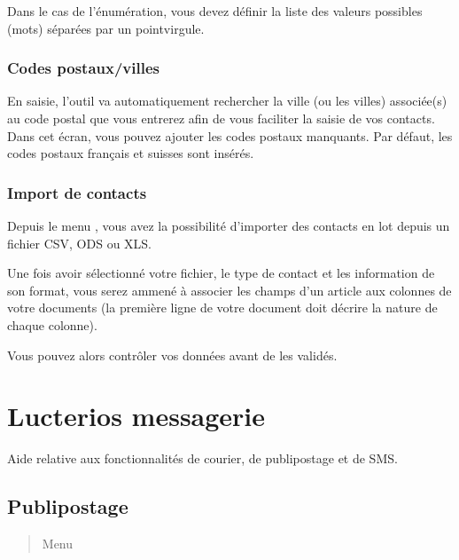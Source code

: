 \documentclass[a4paper,10pt,oneside,french]{sphinxmanual}
\begin{document}
\sphinxAtStartPar
Dans le cas de l’énumération, vous devez définir la liste des valeurs possibles (mots) séparées par un point\sphinxhyphen{}virgule.


\subsection{Codes postaux/villes}
\label{\detokenize{contacts/configuration:codes-postaux-villes}}
\sphinxAtStartPar
En saisie, l’outil va automatiquement rechercher la ville (ou les villes) associée(s) au code postal que vous entrerez afin de vous faciliter la saisie de vos contacts.
Dans cet écran, vous pouvez ajouter les codes postaux manquants.
Par défaut, les codes postaux français et suisses sont insérés.


\subsection{Import de contacts}
\label{\detokenize{contacts/configuration:import-de-contacts}}
\sphinxAtStartPar
Depuis le menu , vous avez la possibilité d’importer des contacts en lot depuis un fichier CSV, ODS ou XLS.

\sphinxAtStartPar
Une fois avoir sélectionné votre fichier, le type de contact et les information de son format,
vous serez ammené à associer les champs d’un article aux colonnes de votre documents (la première ligne de votre document doit décrire la nature de chaque colonne).

\sphinxAtStartPar
Vous pouvez alors contrôler vos données avant de les validés.

\sphinxstepscope


\chapter{Lucterios messagerie}
\label{\detokenize{mailing/index:lucterios-messagerie}}\label{\detokenize{mailing/index::doc}}
\sphinxAtStartPar
Aide relative aux fonctionnalités de courier, de publipostage et de SMS.

\sphinxstepscope


\section{Publipostage}
\label{\detokenize{mailing/mailing:publipostage}}\label{\detokenize{mailing/mailing::doc}}\begin{quote}

\sphinxAtStartPar
Menu 
\end{quote}
\end{document}
